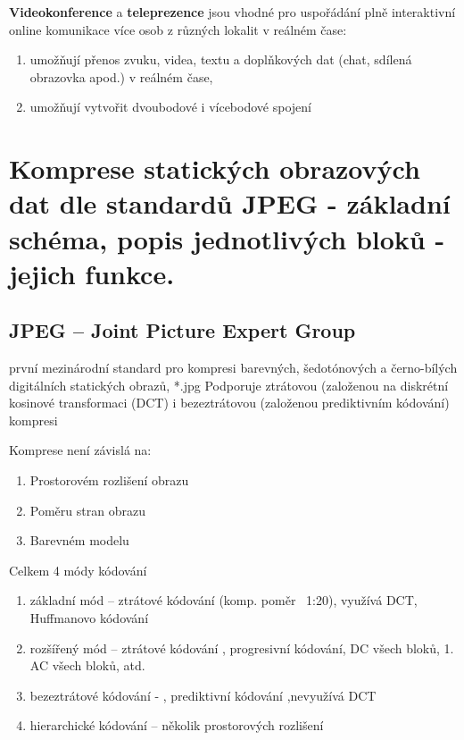 \newpage
\textbf{Videokonference} a \textbf{teleprezence} jsou vhodné pro uspořádání plně interaktivní online komunikace více osob z různých lokalit v reálném čase:
\begin{enumerate}
    \item umožňují přenos zvuku, videa, textu a doplňkových dat (chat, sdílená obrazovka apod.) v reálném čase,
    \item umožňují vytvořit dvoubodové i vícebodové spojení
\end{enumerate}


\newpage
\section{Komprese statických obrazových dat dle standardů JPEG - základní schéma, popis jednotlivých bloků - jejich funkce.}
\subsection{JPEG -- Joint Picture Expert Group}
první mezinárodní standard pro kompresi barevných, šedotónových a černo-bílých
digitálních statických obrazů, *.jpg \newline
Podporuje ztrátovou (založenou na diskrétní kosinové transformaci (DCT) i bezeztrátovou
(založenou prediktivním kódování) kompresi

Komprese není závislá na:
\begin{enumerate}
    \item Prostorovém rozlišení obrazu
    \item Poměru stran obrazu
    \item Barevném modelu
\end{enumerate}

Celkem 4 módy kódování
\begin{enumerate}
    \item základní mód – ztrátové kódování (komp. poměr ~1:20), využívá DCT, Huffmanovo kódování
    \item rozšířený mód – ztrátové kódování , progresivní kódování, DC všech bloků, 1. AC všech bloků, atd.
    \item bezeztrátové kódování - , prediktivní kódování ,nevyužívá DCT
    \item hierarchické kódování – několik prostorových rozlišení
\end{enumerate}

